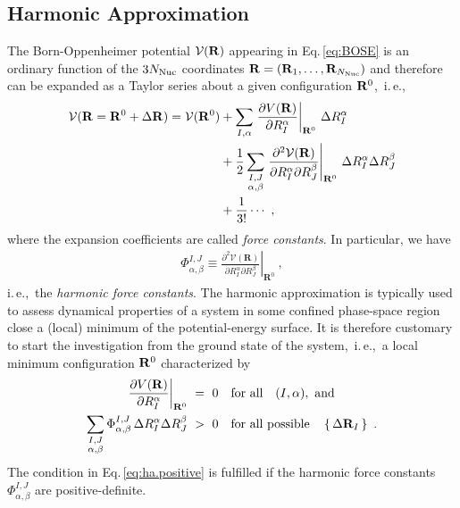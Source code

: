 \subsection{Harmonic Approximation}
The Born-Oppenheimer potential $\mathcal V ({\bf R})$ appearing in Eq.\,\eqref{eq:BOSE} is an ordinary function of the $3 N_{\rm Nuc}$ coordinates ${\bf R} = ({\bf R}_1, \ldots, {\bf R}_{N_{\rm Nuc}})$ and therefore can be expanded as a Taylor series about a given configuration ${\bf R}^0$,~i.\,e.,
\begin{align}
\begin{split}
  \mathcal V ({\bf R} = {\bf R}^0 + \Delta {\bf R})
    = \mathcal V ({\bf R}^0)
    &+ \sum_{I, \alpha} 
      \left. \frac{\partial V({\bf R})}{\partial R^\alpha_I} 
      \right\vert_{{\bf R}^0}
    \,\Delta R^\alpha_I
    \\
    &
    + \frac{1}{2}
    \sum_{\substack{I, J \\ \alpha, \beta}}
    \left.\frac{\partial^{2} \mathcal{V}(\mathbf{R})}{\partial R_{I}^{\alpha} \partial R_{J}^{\beta}}\right|_{\mathbf{R}^{0}}
    \, \Delta R_I^\alpha \Delta R_J^\beta
    \\
    &+\frac{1}{3!}\cdots ~,
\end{split}
\end{align}
where the expansion coefficients are called \emph{force constants}. In particular, we have
\begin{align}
  \Phi_{\alpha, \beta}^{I, J}
  \equiv \left.\frac{\partial^{2} \mathcal{V}(\mathbf{R})}{\partial R_{I}^{\alpha} \partial R_{J}^{\beta}}\right|_{\mathbf{R}^{0}}~,
\end{align}
i.\,e.,~the \emph{harmonic force constants}. The harmonic approximation is typically used to assess dynamical properties of a system in some confined phase-space region close a (local) minimum of the potential-energy surface. It is therefore customary to start the investigation from the ground state of the system,~i.\,e.,~a local minimum configuration ${\bf R}^0$ characterized by
\begin{align}
	\left. \frac{\partial V({\bf R})}{\partial R^\alpha_I} 
	\right\vert_{{\bf R}^0} 
		&~=~ 0 \quad\text{for all}\quad (I, \alpha),~\text{and} \\
	\sum_{\substack{I, J \\ \alpha, \beta}}
	\Phi_{\alpha, \beta}^{I, J}
	\, \Delta R_I^\alpha \Delta R_J^\beta
		&~>~ 0 \quad\text{for all possible}\quad \set{\Delta {\bf R}_I}~.
	\label{eq:ha.positive}
\end{align}
The condition in Eq.\,\eqref{eq:ha.positive} is fulfilled if the harmonic force constants $\Phi_{\alpha, \beta}^{I, J}$ are positive-definite.

